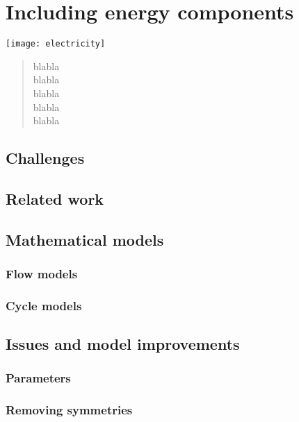 \chapter{Including energy components} \label{chap:energy}
\begin{bibunit}[ieeetr]
\minitoc
\vspace{2cm}

\begin{minipage}[c]{0.45\linewidth}
\texttt{[image: electricity]}
\end{minipage}
\hfill
\begin{minipage}[c]{0.45\linewidth}
\begin{abstract}
blabla\\
blabla\\
blabla\\
blabla\\
blabla\\
\end{abstract}
\end{minipage}

\newpage
\section{Challenges}


\newpage
\section{Related work}


\newpage
\section{Mathematical models}
\subsection{Flow models}
\subsection{Cycle models}


\newpage
\section{Issues and model improvements}
\subsection{Parameters}
\subsection{Removing symmetries}

\end{bibunit}

